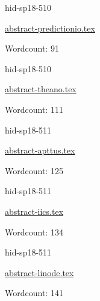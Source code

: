 

\begin{IU}

hid-sp18-510

\href{https://github.com/cloudmesh-community/hid-sp18-510/blob/master//technology/abstract-predictionio.tex}{abstract-predictionio.tex}

 

Wordcount: 91

\end{IU}



\begin{IU}

hid-sp18-510

\href{https://github.com/cloudmesh-community/hid-sp18-510/blob/master//technology/abstract-theano.tex}{abstract-theano.tex}

 

Wordcount: 111

\end{IU}



\begin{IU}

hid-sp18-511

\href{https://github.com/cloudmesh-community/hid-sp18-511/blob/master//technology/abstract-apttus.tex}{abstract-apttus.tex}

 

Wordcount: 125

\end{IU}



\begin{IU}

hid-sp18-511

\href{https://github.com/cloudmesh-community/hid-sp18-511/blob/master//technology/abstract-iics.tex}{abstract-iics.tex}

 

Wordcount: 134

\end{IU}



\begin{IU}

hid-sp18-511

\href{https://github.com/cloudmesh-community/hid-sp18-511/blob/master//technology/abstract-linode.tex}{abstract-linode.tex}

 

Wordcount: 141

\end{IU}

